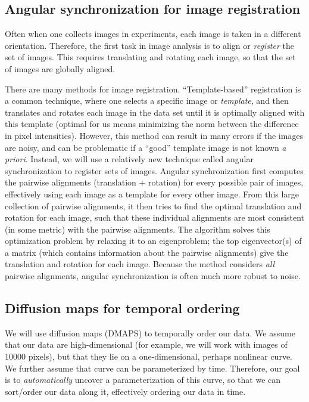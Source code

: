 \documentclass{pnastwo}
\begin{document}
\begin{article}
\subsection{Angular synchronization for image registration}

Often when one collects images in experiments, each image is taken in a different orientation. 
%
Therefore, the first task in image analysis is to align or {\em register} the set of images. 
%
This requires translating and rotating each image, so that the set of images are globally aligned.

There are many methods for image registration. 
%
``Template-based'' registration \cite{ahuja2007template} is a common technique, where one selects a specific image or {\em template}, and then translates and rotates each image in the data set until it is optimally aligned with this template (optimal for us means minimizing the norm between the difference in pixel intensities).
%
However, this method can result in many errors if the images are noisy, and can be problematic if a ``good'' template image is not known {\em a priori}. 
%
Instead, we will use a relatively new technique called angular synchronization\cite{singer2011angular} to register sets of images.
%
Angular synchronization first computes the pairwise alignments (translation + rotation) for every possible pair of images, effectively using each image as a template for every other image.
%
From this large collection of pairwise alignments, it then tries to find the optimal translation and rotation for each image, such that these individual alignments are most consistent (in some metric) with the pairwise alignments.
%
The algorithm solves this optimization problem by relaxing it to an eigenproblem; the top eigenvector(s) of a matrix (which contains information about the pairwise alignments) give the translation and rotation for each image.
%
Because the method considers {\em all} pairwise alignments, angular synchronization is often much more robust to noise. 

\subsection{Diffusion maps for temporal ordering}

We will use diffusion maps (DMAPS) \cite{coifman2005geometric} to temporally order our data.
%
We assume that our data are high-dimensional (for example, we will work with images of 10000 pixels), but that they lie on a one-dimensional, perhaps nonlinear curve.
%
We further assume that curve can be parameterized by time.
%
Therefore, our goal is to {\em automatically} uncover a parameterization of this curve, so that we can sort/order our data along it, effectively ordering our data in time.


\end{article}
\end{document}
